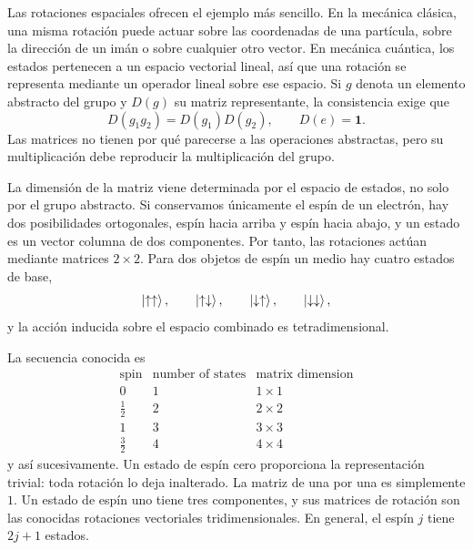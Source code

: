 Las rotaciones espaciales ofrecen el ejemplo más sencillo. En la mecánica clásica, una misma rotación puede actuar sobre las coordenadas de una partícula, sobre la dirección de un imán o sobre cualquier otro vector. En mecánica cuántica, los estados pertenecen a un espacio vectorial lineal, así que una rotación se representa mediante un operador lineal sobre ese espacio. Si \(g\) denota un elemento abstracto del grupo y \(D(g)\) su matriz representante, la consistencia exige que
\begin{equation}
D(g_1g_2)=D(g_1)D(g_2),
\qquad
D(e)=\boldsymbol 1.
\end{equation}
Las matrices no tienen por qué parecerse a las operaciones abstractas, pero su multiplicación debe reproducir la multiplicación del grupo.

La dimensión de la matriz viene determinada por el espacio de estados, no solo por el grupo abstracto. Si conservamos únicamente el espín de un electrón, hay dos posibilidades ortogonales, espín hacia arriba y espín hacia abajo, y un estado es un vector columna de dos componentes. Por tanto, las rotaciones actúan mediante matrices \(2\times2\). Para dos objetos de espín un medio hay cuatro estados de base,
\begin{equation}
\left\lvert\uparrow\uparrow\right\rangle,\qquad
\left\lvert\uparrow\downarrow\right\rangle,\qquad
\left\lvert\downarrow\uparrow\right\rangle,\qquad
\left\lvert\downarrow\downarrow\right\rangle,
\end{equation}
y la acción inducida sobre el espacio combinado es tetradimensional.

La secuencia conocida es
\begin{equation}
\begin{array}{c|c|c}
\text{spin} & \text{number of states} & \text{matrix dimension}\\
\hline
0 & 1 & 1\times1\\
\frac12 & 2 & 2\times2\\
1 & 3 & 3\times3\\
\frac32 & 4 & 4\times4
\end{array}
\end{equation}
y así sucesivamente. Un estado de espín cero proporciona la representación trivial: toda rotación lo deja inalterado. La matriz de una por una es simplemente \(1\). Un estado de espín uno tiene tres componentes, y sus matrices de rotación son las conocidas rotaciones vectoriales tridimensionales. En general, el espín \(j\) tiene \(2j+1\) estados.

